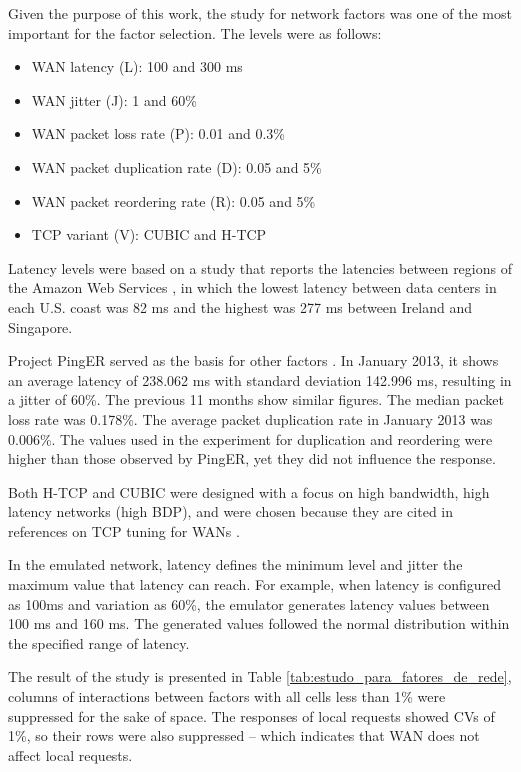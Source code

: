 \documentclass[doublespacing]{bmcart}
\begin{document}
Given the purpose of this work, the study for network factors was one of the
most important for the factor selection. The levels were as follows:

\begin{itemize}

\item WAN latency (L): 100 and 300 ms

\item WAN jitter (J): 1 and 60\%

\item WAN packet loss rate (P): 0.01 and 0.3\%

\item WAN packet duplication rate (D): 0.05 and 5\%

\item WAN packet reordering rate (R): 0.05 and 5\%

\item TCP variant (V): CUBIC and H-TCP

\end{itemize}

Latency levels were based on a study that reports the latencies between regions
of the Amazon Web Services \cite{Sovran2011}, in which the lowest latency
between data centers in each U.S. coast was 82 ms and the highest was 277 ms
between Ireland and Singapore.

Project PingER served as the basis for other factors \cite{PingER2013}. In
January 2013, it shows an average latency of 238.062 ms with standard deviation
142.996 ms, resulting in a jitter of 60\%. The previous 11 months show similar
figures. The median packet loss rate was 0.178\%. The average packet
duplication rate in January 2013 was 0.006\%. The values used in the experiment
for duplication and reordering were higher than those observed by PingER, yet
they did not influence the response.

Both H-TCP and CUBIC were designed with a focus on high bandwidth, high latency
networks (high BDP), and were chosen because they are cited in references on TCP
tuning for WANs \cite{ESnet2012}.

In the emulated network, latency defines the minimum level and jitter the maximum
value that latency can reach. For example, when latency is configured as 100ms and variation
as 60\%, the emulator generates latency values between 100 ms and 160 ms. The
generated values followed the normal distribution within the specified range of
latency.

The result of the study is presented in Table
\ref{tab:estudo_para_fatores_de_rede}, columns of interactions between factors
with all cells less than 1\% were suppressed for the sake of space. The
responses of local requests showed CVs of 1\%, so their rows were also
suppressed -- which indicates that WAN does not affect local requests.
\end{document}
